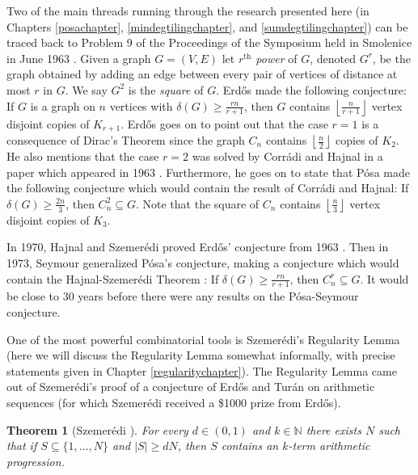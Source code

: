 \documentclass[oneside,12pt]{memoir}
\newtheorem{theorem}{Theorem}[section]
\newcommand{\floor}[1]{\left\lfloor#1\right\rfloor}
\begin{document}
Two of the main threads running through the research presented here (in Chapters \ref{posachapter}, \ref{mindegtilingchapter}, and \ref{sumdegtilingchapter}) can be traced back to Problem 9 of the Proceedings of the Symposium held in Smolenice in June 1963 \cite{E}.  Given a graph $G=(V,E)$ let \emph{$r^\text{th}$ power} of $G$, denoted $G^r$, be the graph obtained by adding an edge between every pair of vertices of distance at most $r$ in $G$.  
We say $G^2$ is the \emph{square} of $G$.  Erd\H{o}s made the following conjecture: If $G$ is a graph on $n$ vertices with $\delta(G)\geq\frac{rn}{r+1}$, then $G$ contains $\floor{\frac{n}{r+1}}$ vertex disjoint copies of $K_{r+1}$.  Erd\H{o}s goes on to point out that the case $r=1$ is a consequence of Dirac's Theorem since the graph $C_n$ contains $\floor{\frac{n}{2}}$ copies of $K_2$.  He also mentions that the case $r=2$ was solved by Corr\'adi and Hajnal in a paper which appeared in 1963 \cite{CH}.  Furthermore, he goes on to state that P\'osa made the following conjecture which would contain the result of Corr\'adi and Hajnal: If $\delta(G)\geq \frac{2n}{3}$, then $C_n^2\subseteq G$.  Note that the square of $C_n$ contains $\floor{\frac{n}{3}}$ vertex disjoint copies of $K_3$.

In 1970, Hajnal and Szemer\'edi proved Erd\H{o}s' conjecture from 1963 \cite{HSz}.  Then in 1973, Seymour generalized P\'osa's conjecture, making a conjecture which would contain the Hajnal-Szemer\'edi Theorem \cite{Sey}: If $\delta(G)\geq \frac{rn}{r+1}$, then $C_n^r\subseteq G$.  It would be close to $30$ years before there were any results on the P\'osa-Seymour conjecture.

One of the most powerful combinatorial tools is Szemer\'edi's Regularity Lemma \cite{Sz} (here we will discuss the Regularity Lemma somewhat informally, with precise statements given in Chapter \ref{regularitychapter}).  The Regularity Lemma came out of Szemer\'edi's proof of a conjecture of Erd\H{o}s and Tur\'an on arithmetic sequences (for which Szemer\'edi received a \$1000 prize from Erd\H{o}s).  

\begin{theorem}[Szemer\'edi \cite{SzPro}]
For every $d\in(0,1)$ and $k\in \mathbb{N}$ there exists $N$ such that if $S\subseteq \{1,\dots, N\}$ and $|S|\geq dN$, then $S$ contains an $k$-term arithmetic progression.  
\end{theorem}
\end{document}
